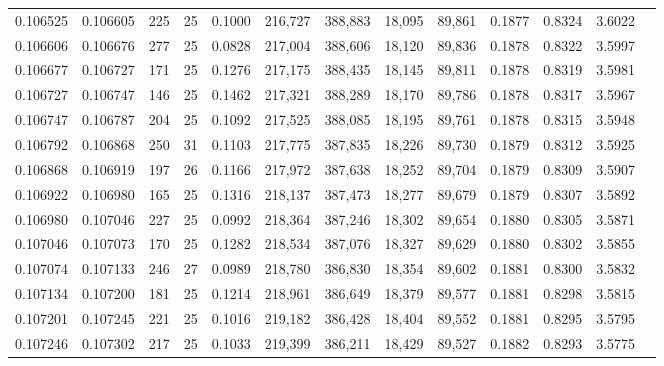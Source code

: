 \begin{tabular}{rrrrrrrrrrrrr}
0.106525 & 0.106605 & 225 &  25 &                                     0.1000 & 216,727 & 388,883 &  18,095 &  89,861 & 0.1877 & 0.8324 & 3.6022 \\
0.106606 & 0.106676 & 277 &  25 &                                     0.0828 & 217,004 & 388,606 &  18,120 &  89,836 & 0.1878 & 0.8322 & 3.5997 \\
0.106677 & 0.106727 & 171 &  25 &                                     0.1276 & 217,175 & 388,435 &  18,145 &  89,811 & 0.1878 & 0.8319 & 3.5981 \\
0.106727 & 0.106747 & 146 &  25 &                                     0.1462 & 217,321 & 388,289 &  18,170 &  89,786 & 0.1878 & 0.8317 & 3.5967 \\
0.106747 & 0.106787 & 204 &  25 &                                     0.1092 & 217,525 & 388,085 &  18,195 &  89,761 & 0.1878 & 0.8315 & 3.5948 \\
0.106792 & 0.106868 & 250 &  31 &                                     0.1103 & 217,775 & 387,835 &  18,226 &  89,730 & 0.1879 & 0.8312 & 3.5925 \\
0.106868 & 0.106919 & 197 &  26 &                                     0.1166 & 217,972 & 387,638 &  18,252 &  89,704 & 0.1879 & 0.8309 & 3.5907 \\
0.106922 & 0.106980 & 165 &  25 &                                     0.1316 & 218,137 & 387,473 &  18,277 &  89,679 & 0.1879 & 0.8307 & 3.5892 \\
0.106980 & 0.107046 & 227 &  25 &                                     0.0992 & 218,364 & 387,246 &  18,302 &  89,654 & 0.1880 & 0.8305 & 3.5871 \\
0.107046 & 0.107073 & 170 &  25 &                                     0.1282 & 218,534 & 387,076 &  18,327 &  89,629 & 0.1880 & 0.8302 & 3.5855 \\
0.107074 & 0.107133 & 246 &  27 &                                     0.0989 & 218,780 & 386,830 &  18,354 &  89,602 & 0.1881 & 0.8300 & 3.5832 \\
0.107134 & 0.107200 & 181 &  25 &                                     0.1214 & 218,961 & 386,649 &  18,379 &  89,577 & 0.1881 & 0.8298 & 3.5815 \\
0.107201 & 0.107245 & 221 &  25 &                                     0.1016 & 219,182 & 386,428 &  18,404 &  89,552 & 0.1881 & 0.8295 & 3.5795 \\
0.107246 & 0.107302 & 217 &  25 &                                     0.1033 & 219,399 & 386,211 &  18,429 &  89,527 & 0.1882 & 0.8293 & 3.5775 \\

\end{tabular}
